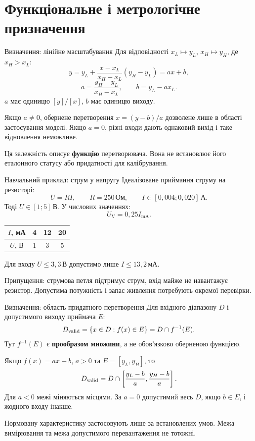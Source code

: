 \documentclass[aspectratio=169,11pt]{beamer}
\newcommand{\unit}[1]{\,\text{#1}}
\begin{document}
\section{Функціональне і метрологічне призначення}
\begin{frame}{Визначення: лінійне масштабування}
Для відповідності $x_L\mapsto y_L$, $x_H\mapsto y_H$, де $x_H>x_L$:
\[
y=y_L+\frac{x-x_L}{x_H-x_L}(y_H-y_L)=ax+b,
\]
\[
a=\frac{y_H-y_L}{x_H-x_L},\qquad b=y_L-ax_L.
\]
$a$ має одиницю $[y]/[x]$, $b$ має одиницю виходу.
\medskip

Якщо $a\ne0$, обернене перетворення $x=(y-b)/a$ дозволене лише в області застосування моделі. Якщо $a=0$, різні входи дають однаковий вихід і таке відновлення неможливе.
\medskip

Ця залежність описує \textbf{функцію} перетворювача. Вона не встановлює його еталонного статусу або придатності для калібрування.
\end{frame}

\begin{frame}{Навчальний приклад: струм у напругу}
Ідеалізоване приймання струму на резисторі:
\[
U=RI,\qquad R=250\unit{Ом},\qquad I\in[0{,}004;0{,}020]\unit{А}.
\]
Тоді $U\in[1;5]\unit{В}$. У числових значеннях:
\[
U_{\mathrm V}=0{,}25I_{\mathrm{mA}}.
\]
\begin{center}
\begin{tabular}{c|ccc}
$I$, мА & 4 & 12 & 20\\\hline
$U$, В & 1 & 3 & 5
\end{tabular}
\end{center}
Для входу $U\le3{,}3\unit{В}$ допустимо лише $I\le13{,}2\unit{мА}$.
\medskip

Припущення: струмова петля підтримує струм, вхід майже не навантажує резистор. Допустима потужність і запас живлення потребують окремої перевірки.
\end{frame}

\begin{frame}{Визначення: область придатного перетворення}
Для вхідного діапазону $D$ і допустимого виходу приймача $E$:
\[
D_{\rm valid}=\{x\in D:f(x)\in E\}=D\cap f^{-1}(E).
\]
Тут $f^{-1}(E)$ є \textbf{прообразом множини}, а не обов'язково оберненою функцією.
\medskip

Якщо $f(x)=ax+b$, $a>0$ та $E=[y_L,y_H]$, то
\[
D_{\rm valid}=D\cap\left[\frac{y_L-b}{a},\frac{y_H-b}{a}\right].
\]
Для $a<0$ межі міняються місцями. За $a=0$ допустимий весь $D$, якщо $b\in E$, і жодного входу інакше.
\medskip

Нормовану характеристику застосовують лише за встановлених умов. Межа вимірювання та межа допустимого перевантаження не тотожні.
\end{frame}
\end{document}
